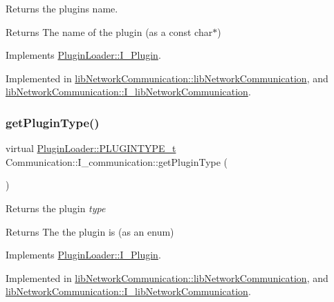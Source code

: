 Returns the plugins name. 

\begin{DoxyReturn}{Returns}
The name of the plugin (as a const char$\ast$) 
\end{DoxyReturn}


Implements \mbox{\hyperlink{classPluginLoader_1_1I__Plugin_a4c45255b16398fff512940a5e5b8322a}{Plugin\+Loader\+::\+I\+\_\+\+Plugin}}.



Implemented in \mbox{\hyperlink{classlibNetworkCommunication_1_1libNetworkCommunication_a2d09c69b582a66b37100ce87ee1acdd1}{lib\+Network\+Communication\+::lib\+Network\+Communication}}, and \mbox{\hyperlink{classlibNetworkCommunication_1_1I__libNetworkCommunication_aa4a1a2180bdbf7b13ec0dd17f3cbb459}{lib\+Network\+Communication\+::\+I\+\_\+lib\+Network\+Communication}}.

\mbox{\label{classCommunication_1_1I__communication_a531577d9a13f3fcb566a350b74184823}} 
\subsubsection{\texorpdfstring{getPluginType()}{getPluginType()}}
{\footnotesize\ttfamily virtual \mbox{\hyperlink{namespacePluginLoader_a7b1358e9577b47b5d4b16231a5a81699}{Plugin\+Loader\+::\+P\+L\+U\+G\+I\+N\+T\+Y\+P\+E\+\_\+t}} Communication\+::\+I\+\_\+communication\+::get\+Plugin\+Type (\begin{DoxyParamCaption}{ }\end{DoxyParamCaption})\hspace{0.3cm}{\ttfamily [pure virtual]}}



Returns the plugin {\itshape type} 

\begin{DoxyReturn}{Returns}
The the plugin is (as an enum) 
\end{DoxyReturn}


Implements \mbox{\hyperlink{classPluginLoader_1_1I__Plugin_aa7d2ca3f7a8551c590a7cbda0f1648f5}{Plugin\+Loader\+::\+I\+\_\+\+Plugin}}.



Implemented in \mbox{\hyperlink{classlibNetworkCommunication_1_1libNetworkCommunication_a6851c7c48cde1af3d2b6e131fce6b8bc}{lib\+Network\+Communication\+::lib\+Network\+Communication}}, and \mbox{\hyperlink{classlibNetworkCommunication_1_1I__libNetworkCommunication_a22412ea75e41d612c66c42b3c4dab1f3}{lib\+Network\+Communication\+::\+I\+\_\+lib\+Network\+Communication}}.

